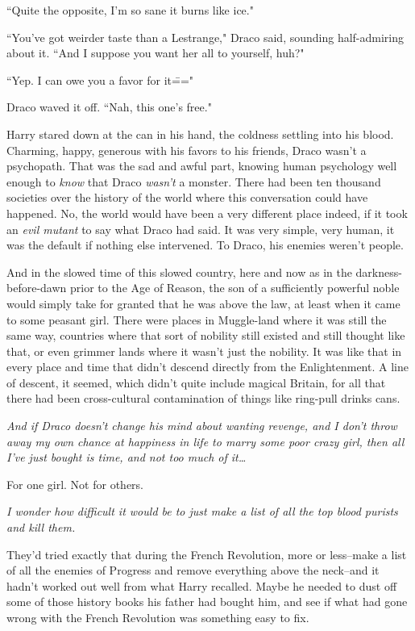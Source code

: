 ``Quite the opposite, I'm so sane it burns like ice."

``You've got weirder taste than a Lestrange," Draco said, sounding half-admiring about it. ``And I suppose you want her all to yourself, huh?"

``Yep. I can owe you a favor for it\==="

Draco waved it off. ``Nah, this one's free."

Harry stared down at the can in his hand, the coldness settling into his blood. Charming, happy, generous with his favors to his friends, Draco wasn't a psychopath. That was the sad and awful part, knowing human psychology well enough to \emph{know} that Draco \emph{wasn't} a monster. There had been ten thousand societies over the history of the world where this conversation could have happened. No, the world would have been a very different place indeed, if it took an \emph{evil mutant} to say what Draco had said. It was very simple, very human, it was the default if nothing else intervened. To Draco, his enemies weren't people.

And in the slowed time of this slowed country, here and now as in the darkness-before-dawn prior to the Age of Reason, the son of a sufficiently powerful noble would simply take for granted that he was above the law, at least when it came to some peasant girl. There were places in Muggle-land where it was still the same way, countries where that sort of nobility still existed and still thought like that, or even grimmer lands where it wasn't just the nobility. It was like that in every place and time that didn't descend directly from the Enlightenment. A line of descent, it seemed, which didn't quite include magical Britain, for all that there had been cross-cultural contamination of things like ring-pull drinks cans.

\emph{And if Draco doesn't change his mind about wanting revenge, and I don't throw away my own chance at happiness in life to marry some poor crazy girl, then all I've just bought is time, and not too much of it{\ldots}}

For one girl. Not for others.

\emph{I wonder how difficult it would be to just make a list of all the top blood purists and kill them.}

They'd tried exactly that during the French Revolution, more or less\---make a list of all the enemies of Progress and remove everything above the neck\---and it hadn't worked out well from what Harry recalled. Maybe he needed to dust off some of those history books his father had bought him, and see if what had gone wrong with the French Revolution was something easy to fix.

